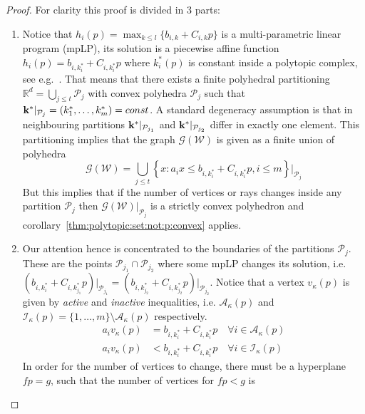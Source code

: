 \documentclass[journal]{IEEEtran}
\theoremstyle{remark}
\theoremstyle{definition}
\begin{document}
\begin{proof}
For clarity this proof is divided in 3 parts:
\begin{enumerate}
\item Notice that $h_i(p) = \max_{k\leq l} \{b_{i,k} + C_{i,k}p\}$ is a multi-parametric linear program (mpLP),
its solution is a piecewise affine function $h_i(p) = b_{i,k^\ast_i} + C_{i,k^\ast_i}p$ where $k^\ast_i(p)$ is constant
inside a polytopic complex, see e.g.~\cite{spjotvold:2005}.
%
That means that there exists a finite polyhedral partitioning $\mathbb R^d = \bigcup_{j\leq t} \mathcal P_j$ with convex polyhedra 
$\mathcal P_j$ such that ${\bf{k}}^\ast\vert_{\mathcal P_j} = (k_1^\ast,\dots,k_m^\ast) = const$.
%
A standard degeneracy assumption is that in neighbouring partitions ${\bf{k}}^\ast\vert_{\mathcal P_{j_1}}$ and 
${\bf{k}}^\ast\vert_{\mathcal P_{j_2}}$ differ in exactly one element.
%
This partitioning implies that the graph $\mathscr G(\mathcal W)$ is given as a finite union of polyhedra
%
\begin{equation*}
  \mathscr G(\mathcal W) = \bigcup_{j\leq t} \left\{x: a_i x \leq b_{i,k_i^\ast} + C_{i,k_i^\ast}p,i\leq m
  \right\}\bigr\vert_{\mathcal P_{j}}
\end{equation*}
%
But this implies that if the number of vertices or rays changes inside any partition $\mathcal P_j$ then $\mathscr
G(\mathcal W)\vert_{\mathcal P_j}$ is a strictly convex polyhedron and corollary~\ref{thm:polytopic:set:not:p:convex} applies.
%
\item Our attention hence is concentrated to the boundaries of the partitions $\mathcal P_j$.
%
These are the points $\mathcal P_{j_1} \cap \mathcal P_{j_2}$ where some mpLP changes its solution, i.e. 
$\left(b_{i,k_i^\ast} + C_{i,k_{j_1}^\ast} p\right)\big\vert_{\mathcal P_{j_1}} = 
\left(b_{i,k_{j_2}^\ast} + C_{i,k_{j_2}^\ast} p\right)\big\vert_{\mathcal P_{j_2}}$.
%
Notice that a vertex $v_\kappa(p)$ is given by \emph{active} and \emph{inactive} inequalities, i.e. $\mathcal A_\kappa(p)$ and
$\mathcal I_\kappa(p) = \{1,\dots,m\}\setminus\mathcal A_\kappa(p)$ respectively.
%
\begin{equation*}\begin{split}
  a_i v_\kappa(p) &= b_{i,k_i^\ast} + C_{i,k_i^\ast} p \quad\forall i\in\mathcal A_\kappa(p)\\
  a_i v_\kappa(p) &< b_{i,k_i^\ast} + C_{i,k_i^\ast} p \quad\forall i\in\mathcal I_\kappa(p)
\end{split}\end{equation*}
%
In order for the number of vertices to change, there must be a hyperplane $fp=g$, such that the number of vertices for $fp<g$ is 

\end{enumerate}
\end{proof}
\end{document}
